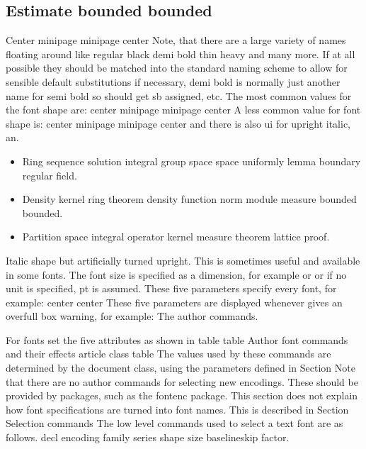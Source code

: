 \documentclass{article}
\begin{document}
\subsection{Estimate bounded bounded}
Center minipage minipage center Note, that there are a large variety of names floating around like regular black demi bold thin heavy and many more. If at all possible they should be matched into the standard naming scheme to allow for sensible default substitutions if necessary, demi bold is normally just another name for semi bold so should get sb assigned, etc. The most common values for the font shape are: center minipage minipage center A less common value for font shape is: center minipage minipage center and there is also ui for upright italic, an.
\begin{itemize}
\item Ring sequence solution integral group space space uniformly lemma boundary regular field.
\item Density kernel ring theorem density function norm module measure bounded bounded.
\item Partition space integral operator kernel measure theorem lattice proof.
\end{itemize}

Italic shape but artificially turned upright. This is sometimes useful and available in some fonts. The font size is specified as a dimension, for example or or if no unit is specified, pt is assumed. These five parameters specify every font, for example: center center These five parameters are displayed whenever gives an overfull box warning, for example: The author commands.

For fonts set the five attributes as shown in table table Author font commands and their effects article class table The values used by these commands are determined by the document class, using the parameters defined in Section Note that there are no author commands for selecting new encodings. These should be provided by packages, such as the fontenc package. This section does not explain how font specifications are turned into font names. This is described in Section Selection commands The low level commands used to select a text font are as follows. decl encoding family series shape size baselineskip factor.
\end{document}
